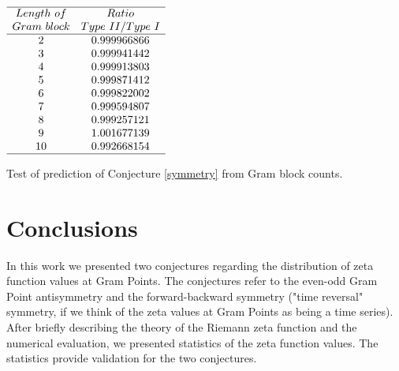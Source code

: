 \documentclass[twoside]{article}
\begin{document}
\begin{table}
\centering \(\begin{array}{cc}
\hline
Length~of 	& Ratio  \\
Gram~block	& Type~II/Type~I \\
\hline
2& 0.999966866\\
3& 0.999941442\\
4& 0.999913803\\
5& 0.999871412\\
6& 0.999822002\\
7& 0.999594807\\
8& 0.999257121\\
9& 1.001677139\\
10& 0.992668154\\
\hline
\end{array}\)
\caption{Test of prediction of Conjecture \ref{symmetry} from Gram block counts.} \label{tab:rosser}
\end{table}

\section{\label{conclusions}Conclusions}

In this work we presented two conjectures regarding the distribution of zeta function values at Gram Points. The conjectures refer to the even-odd Gram Point antisymmetry and the forward-backward symmetry ("time reversal" symmetry, if we think of the zeta values at Gram Points as being a time series). After briefly describing the theory of the Riemann zeta function and the numerical evaluation, we presented statistics of the zeta function values. The statistics provide validation for the two conjectures.
\end{document}
